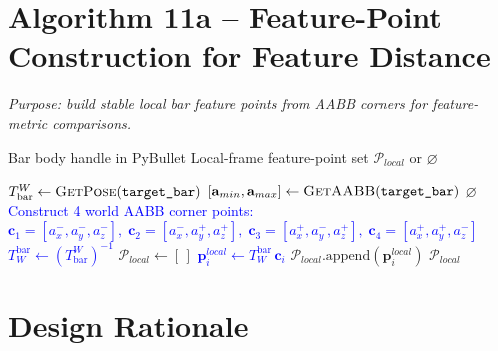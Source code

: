 \documentclass[11pt]{article}
\newcommand{\chg}[1]{\textcolor{blue}{#1}}
\newcommand{\AlgTarget}[1]{\hypertarget{#1}{}}
\begin{document}
\section*{Algorithm 11a -- Feature-Point Construction for Feature Distance}
\noindent\textit{Purpose: build stable local bar feature points from AABB corners for feature-metric comparisons.}
\AlgTarget{alg:compute_bar_feature_points}
\begin{algorithm}[H]
\caption{\textsc{ComputeBarFeaturePoints}($\texttt{target\_bar}$)}
\begin{algorithmic}[1]
\Require Bar body handle in PyBullet
\Ensure  Local-frame feature-point set $\mathcal{P}_{local}$ or $\varnothing$

\State \chg{$T^W_{\text{bar}} \gets \textsc{GetPose}(\texttt{target\_bar})$}
\State \chg{$[\mathbf{a}_{min}, \mathbf{a}_{max}] \gets \textsc{GetAABB}(\texttt{target\_bar})$}
\If{\chg{$\mathbf{a}_{min}=\varnothing$ or $\mathbf{a}_{max}=\varnothing$}}
  \State \Return $\varnothing$
\EndIf
\State \chg{Construct 4 world AABB corner points:}
\State \chg{$\mathbf{c}_1=[a_x^{-},a_y^{-},a_z^{-}],\;
            \mathbf{c}_2=[a_x^{-},a_y^{+},a_z^{+}],\;
            \mathbf{c}_3=[a_x^{+},a_y^{-},a_z^{+}],\;
            \mathbf{c}_4=[a_x^{+},a_y^{+},a_z^{-}]$}
\State \chg{$T^{\text{bar}}_{W} \gets (T^W_{\text{bar}})^{-1}$}
\State $\mathcal{P}_{local} \gets [\,]$
  \State \chg{$\mathbf{p}^{local}_i \gets T^{\text{bar}}_{W}\,\mathbf{c}_i$}
  \State $\mathcal{P}_{local}.\text{append}(\mathbf{p}^{local}_i)$
\EndFor
\State \Return $\mathcal{P}_{local}$
\end{algorithmic}
\end{algorithm}

\section*{Design Rationale}
\end{document}
